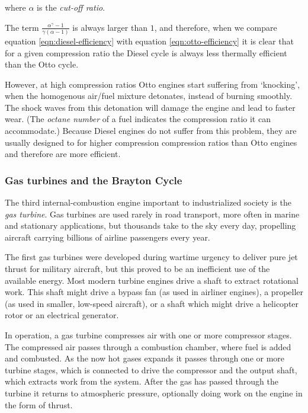 where \(\alpha \) is the \textit{cut-off ratio}. 

The term \( \frac{\alpha^{\gamma}-1}{\gamma(\alpha-1)} \) is always larger
than \(1 \), and therefore, when we compare equation \ref{eqn:diesel-efficiency}
with equation \ref{eqn:otto-efficiency} it is clear that for a given
compression ratio the Diesel cycle is always less thermally efficient than the
Otto cycle. 

However, at high compression ratios Otto engines start suffering from
`knocking', when the homogenous air/fuel mixture detonates, instead of burning
smoothly. The shock waves from this detonation will damage the engine and lead
to faster wear. (The \textit{octane number} of a fuel indicates the compression
ratio it can accommodate.) Because Diesel engines do not suffer from this
problem, they are usually designed to for higher compression compression ratios
than Otto engines and therefore are more efficient.

\subsubsection{Gas turbines and the Brayton Cycle}

The third internal\hyp{}combustion engine important to industrialized society is
the \textit{gas turbine}. Gas turbines are used rarely in road transport, more
often in marine and stationary applications, but thousands take to the sky
every day, propelling aircraft \autocite{Morris2017} carrying billions of airline
passengers every year.

The first gas turbines were developed during wartime urgency to deliver pure jet
thrust for military aircraft, but this proved to be an inefficient use of the
available energy. Most modern turbine engines drive a shaft to extract
rotational work. This shaft might drive a bypass fan (as used in airliner engines), a
propeller (as used in smaller, low-speed aircraft), or a shaft which might drive
a helicopter rotor or an electrical generator.

In operation, a gas turbine compresses air with one or more compressor stages.
The compressed air passes through a combustion chamber, where fuel is added and
combusted. As the now hot gases expands it passes through one or more turbine
stages, which is connected to drive the compressor and the output shaft, which
extracts work from the system. After the gas has passed through the turbine it
returns to atmospheric pressure, optionally doing work on the engine in the form
of thrust.

